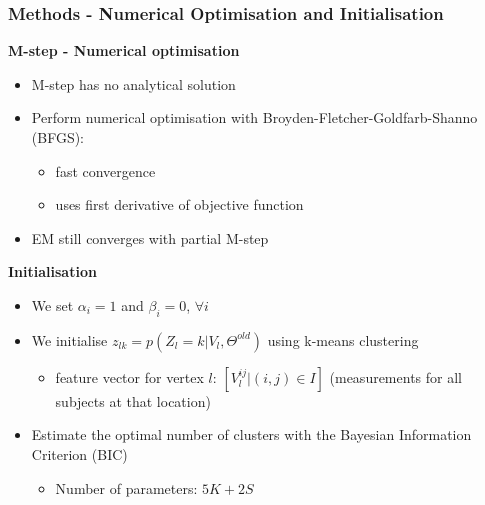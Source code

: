 \documentclass[8pt,xcolor=table]{beamer}
\begin{document}
\begin{frame}
\frametitle{Methods - Numerical Optimisation and Initialisation}

\textbf{M-step - Numerical optimisation} 
\begin{itemize}
\item M-step has no analytical solution
\item Perform numerical optimisation with Broyden-Fletcher-Goldfarb-Shanno (BFGS):
\begin{itemize}
  \item fast convergence
  \item uses first derivative of objective function
\end{itemize}
\item EM still converges with partial M-step
\end{itemize}

\vfill

\textbf{Initialisation}

\begin{itemize}
 \item We set $\alpha_i=1$ and $\beta_i=0$, $\forall i$
 \item We initialise $z_{lk} = p(Z_l = k|V_l,\Theta^{old})$ using k-means clustering
 \begin{itemize}
  \item feature vector for vertex $l$: $\left[ V_l^{ij} | (i,j) \in I \right]$ (measurements for all subjects at that location)
 \end{itemize}

 \item Estimate the optimal number of clusters with the Bayesian Information Criterion (BIC)
 \begin{itemize}
  \item Number of parameters: $5K + 2S$
 \end{itemize}

\end{itemize}

\end{frame}
\end{document}
